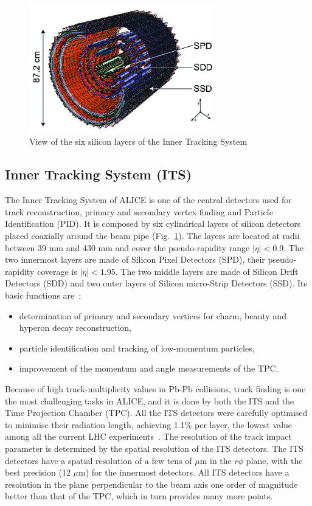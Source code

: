 \begin{figure}[!t]
\centering
\includegraphics[width=8cm]{FigCap3/figures_its-rf-2.png}
\caption{View of the six silicon layers of the Inner Tracking System}
\label{fig:image2}
\end{figure}

\subsection{Inner Tracking System (ITS)}
The Inner Tracking System of ALICE is one of the central detectors used for track 
reconstruction, primary and secondary vertex finding and Particle Identification (PID).
It is composed by six cylindrical layers of silicon detectors placed 
coaxially around the beam pipe (Fig.~\ref{fig:image2}). The layers are located 
at radii between 39 mm and 430 mm and cover the pseudo-rapidity range 
$|\eta|<0.9$. The two innermost layers are made of Silicon Pixel Detectors (SPD), 
their pseudo-rapidity coverage is $|\eta|<1.95$. The two middle layers are made of Silicon Drift Detectors (SDD) 
and two outer layers of Silicon micro-Strip Detectors (SSD).
Its basic functions are~\cite{ITS-TDR}:
\begin{itemize}
\item determination of primary and secondary vertices for charm, beauty and hyperon decay reconstruction,
\item particle identification and tracking of low-momentum particles,
\item improvement of the momentum and angle measurements of the TPC.
\end{itemize}
Because of high track-multiplicity values in Pb-Pb collisions,
 track finding is one the most challenging tasks in ALICE, and it is done by both the 
 ITS and the Time Projection Chamber (TPC). All the ITS detectors were carefully optimised to minimise their radiation 
 length, achieving 1.1\% per layer, the lowest value among all the current LHC experiments~\cite{ITS-TDR}. 
The resolution of the track impact parameter is determined by the spatial resolution of 
the ITS detectors. The ITS detectors have a spatial resolution of a few tens of 
$\mu$m in the $r\phi$ plane, with the best precision (12  $\mu$m) for the 
innermost detectors. All ITS detectors have a resolution in the plane perpendicular 
to the beam axis one order of magnitude better than that of the TPC, which in turn provides many more points.\\
 
